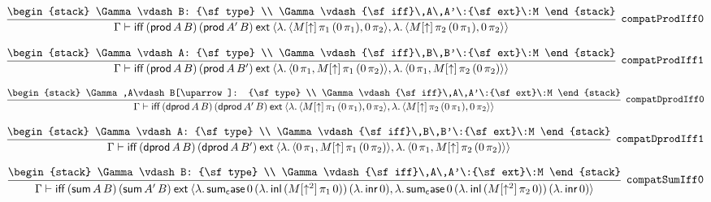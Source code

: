 \[
\infer[{\tt compatProdIff0}]{\Gamma \vdash {\sf iff}\,({\sf prod}\,A\,B)\,({\sf prod}\,A'\,B)\:{\sf ext}\:\langle \lambda .\,\langle M[\uparrow ]\, \pi_1\,(0\, \pi_1),0\, \pi_2\rangle ,\lambda .\,\langle M[\uparrow ]\, \pi_2\,(0\, \pi_1),0\, \pi_2\rangle \rangle }{
\begin{stack}
\Gamma \vdash B: {\sf type}
\\
\Gamma \vdash {\sf iff}\,A\,A'\:{\sf ext}\:M
\end{stack}}
\]

\[
\infer[{\tt compatProdIff1}]{\Gamma \vdash {\sf iff}\,({\sf prod}\,A\,B)\,({\sf prod}\,A\,B')\:{\sf ext}\:\langle \lambda .\,\langle 0\, \pi_1,M[\uparrow ]\, \pi_1\,(0\, \pi_2)\rangle ,\lambda .\,\langle 0\, \pi_1,M[\uparrow ]\, \pi_2\,(0\, \pi_2)\rangle \rangle }{
\begin{stack}
\Gamma \vdash A: {\sf type}
\\
\Gamma \vdash {\sf iff}\,B\,B'\:{\sf ext}\:M
\end{stack}}
\]

\[
\infer[{\tt compatDprodIff0}]{\Gamma \vdash {\sf iff}\,({\sf dprod}\,A\,B)\,({\sf dprod}\,A'\,B)\:{\sf ext}\:\langle \lambda .\,\langle M[\uparrow ]\, \pi_1\,(0\, \pi_1),0\, \pi_2\rangle ,\lambda .\,\langle M[\uparrow ]\, \pi_2\,(0\, \pi_1),0\, \pi_2\rangle \rangle }{
\begin{stack}
\Gamma ,A\vdash B[\uparrow ]: {\sf type}
\\
\Gamma \vdash {\sf iff}\,A\,A'\:{\sf ext}\:M
\end{stack}}
\]

\[
\infer[{\tt compatDprodIff1}]{\Gamma \vdash {\sf iff}\,({\sf dprod}\,A\,B)\,({\sf dprod}\,A\,B')\:{\sf ext}\:\langle \lambda .\,\langle 0\, \pi_1,M[\uparrow ]\, \pi_1\,(0\, \pi_2)\rangle ,\lambda .\,\langle 0\, \pi_1,M[\uparrow ]\, \pi_2\,(0\, \pi_2)\rangle \rangle }{
\begin{stack}
\Gamma \vdash A: {\sf type}
\\
\Gamma \vdash {\sf iff}\,B\,B'\:{\sf ext}\:M
\end{stack}}
\]

\[
\infer[{\tt compatSumIff0}]{\Gamma \vdash {\sf iff}\,({\sf sum}\,A\,B)\,({\sf sum}\,A'\,B)\:{\sf ext}\:\langle \lambda .\,{\sf sum_case}\,0\,(\lambda .\,{\sf inl}\,(M[\uparrow^2]\, \pi_1\,0))\,(\lambda .\,{\sf inr}\,0),\lambda .\,{\sf sum_case}\,0\,(\lambda .\,{\sf inl}\,(M[\uparrow^2]\, \pi_2\,0))\,(\lambda .\,{\sf inr}\,0)\rangle }{
\begin{stack}
\Gamma \vdash B: {\sf type}
\\
\Gamma \vdash {\sf iff}\,A\,A'\:{\sf ext}\:M
\end{stack}}
\]

